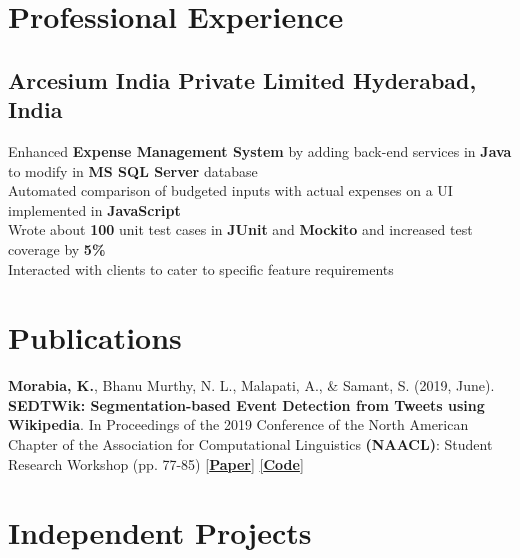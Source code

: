 \documentclass[]{Keval-resume}
\begin{document}
\section{Professional Experience} 
\hrulefill
\postsectionsep

\subsection{Arcesium India Private Limited \hfill \normalfont H\lowercase{yderabad}, I\lowercase{ndia}}
\textbullet{} Enhanced \textbf{Expense Management System} by adding back-end services in \textbf{Java} to modify in \textbf{MS SQL Server} database \\
\textbullet{} Automated comparison of budgeted inputs with actual expenses on a UI implemented in \textbf{JavaScript} \\
\textbullet{} Wrote about \textbf{100} unit test cases in \textbf{JUnit} and \textbf{Mockito} and increased test coverage by \textbf{5\%} \\
\textbullet{} Interacted with clients to cater to specific feature requirements
\sectionsep

\section{Publications} 
\hrulefill
\postsectionsep 

\textbullet{} \textbf{Morabia, K.}, Bhanu Murthy, N. L., Malapati, A., \& Samant, S. (2019, June). \textbf{SEDTWik: Segmentation-based Event Detection from Tweets using Wikipedia}. In Proceedings of the 2019 Conference of the North American Chapter of the Association for Computational Linguistics \textbf{(NAACL)}: Student Research Workshop (pp. 77-85) \href{https://www.aclweb.org/anthology/papers/N/N19/N19-3011/}{[\textbf{Paper}]} \href{https://github.com/kevalmorabia97/SEDTWik-Event-Detection-from-Tweets}{[\textbf{Code}]}
\sectionsep

\section{Independent Projects}
\hrulefill
\postsectionsep
\end{document}
